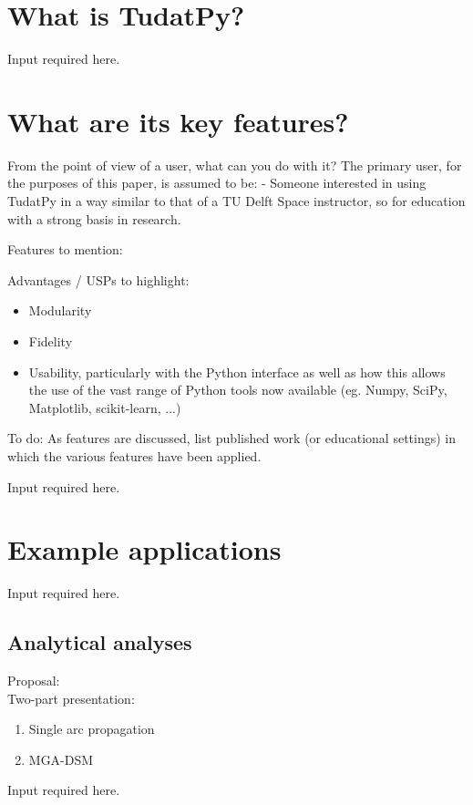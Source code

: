 \documentclass[]{IAC_style_updated}
\begin{document}
\section{What is TudatPy?}
    \lbrack Input required here.\rbrack

\section{What are its key features?}

    From the point of view of a user, what can you do with it?
    The primary user, for the purposes of this paper, is assumed to be:
    - Someone interested in using TudatPy in a way similar to that of a TU Delft Space instructor, so for education with a strong basis in research.

    Features to mention:

    Advantages / USPs to highlight:
    \begin{itemize}
        \item Modularity
        \item Fidelity
        \item Usability, particularly with the Python interface as well as how this allows the use of the vast range of Python tools now available (eg. Numpy, SciPy, Matplotlib, scikit-learn, ...)
    \end{itemize}

    To do:
    \lbrack \rbrack As features are discussed, list published work (or educational settings) in which the various features have been applied.

    \lbrack Input required here.\rbrack

\section{Example applications}
    \lbrack Input required here.\rbrack

    \subsection{Analytical analyses}
    Proposal: \\
    Two-part presentation: 
    \begin{enumerate}
        \item Single arc propagation
        \item MGA-DSM
    \end{enumerate}
    \lbrack Input required here.\rbrack
\end{document}
